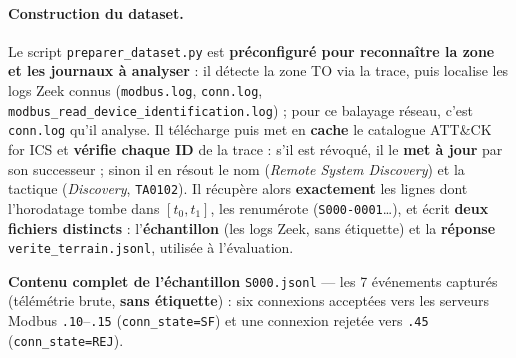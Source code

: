 \paragraph{Construction du dataset.} Le script \lstinline|preparer_dataset.py| est
\textbf{préconfiguré pour reconnaître la zone et les journaux à analyser} : il
détecte la zone TO via la trace, puis localise les logs Zeek connus
(\texttt{modbus.log}, \texttt{conn.log}, \texttt{modbus\_read\_device\_identification.log}) ;
pour ce balayage réseau, c'est \texttt{conn.log} qu'il analyse. Il télécharge puis
met en \textbf{cache} le catalogue ATT\&CK for ICS et \textbf{vérifie chaque ID} de
la trace : s'il est révoqué, il le \textbf{met à jour} par son successeur ; sinon il
en résout le nom (\emph{Remote System Discovery}) et la tactique (\emph{Discovery},
\texttt{TA0102}). Il récupère alors \textbf{exactement} les lignes dont l'horodatage
tombe dans $[t_0,t_1]$, les renumérote (\texttt{S000-0001}\dots), et écrit
\textbf{deux fichiers distincts} : l'\textbf{échantillon} (les logs Zeek, sans
étiquette) et la \textbf{réponse} \texttt{verite\_terrain.jsonl}, utilisée à
l'évaluation.

\noindent\textbf{Contenu complet de l'échantillon} \texttt{S000.jsonl} — les 7
événements capturés (télémétrie brute, \textbf{sans étiquette}) : six connexions
acceptées vers les serveurs Modbus \texttt{.10}–\texttt{.15}
(\texttt{conn\_state=SF}) et une connexion rejetée vers \texttt{.45}
(\texttt{conn\_state=REJ}).

